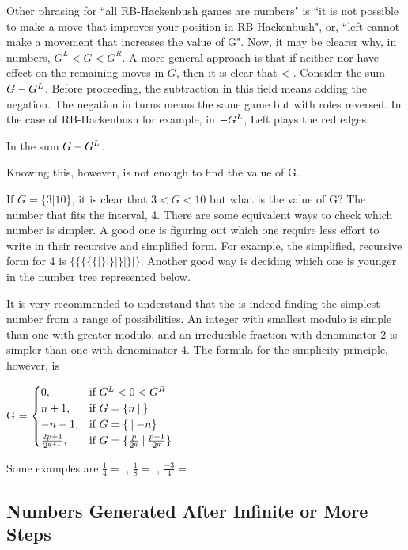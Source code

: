 Other phrasing for ``all RB-Hackenbush games are numbers" is ``it is not possible to make a move that improves your position in  RB-Hackenbush", or, ``left cannot make a movement that increases the value of G". Now, it may be clearer why, in numbers, $G^L < G < G^R$. A more general approach is that if neither  nor  have effect on the remaining moves in $G$, then it is clear that  < \Gm{}. Consider the sum $\mbox{$G$} - \mbox{$G^L$}$. Before proceeding, the subtraction in this field means adding the negation. The negation in turns means the same game but with roles reversed. In the case of RB-Hackenbush for example, in ${-}\mbox{$G^L$}$, Left plays the red edges.

In the sum $\mbox{$G$} - \mbox{$G^L$}$.

Knowing this, however, is not enough to find the value of G.

If $G = \{3 | 10\}$, it is clear that $3 < G < 10$ but what is the value of G? The  number that fits the interval, 4. There are some equivalent ways to check which number is simpler. A good one is figuring out which one require less effort to write in their recursive and simplified form. For example, the simplified, recursive form for 4 is $\{\{\{\{\{|\}|\}|\}|\} | \}$. Another good way is deciding which one is younger in the number tree represented below.

It is very recommended to understand that the  is indeed finding the simplest number from a range of possibilities. An integer with smallest modulo is simple than one with greater modulo, and an irreducible fraction with denominator 2 is simpler than one with denominator 4. The formula for the simplicity principle, however, is 

G = 
$
\begin{cases}
	0, &\text{if } G^L < 0 < G^R\\
	n+1, &\text{if } \mbox{$G= \mbox{$\{n\:|\:\}$}$}\\
	-n-1, &\text{if } \mbox{$G= \mbox{$\{\:|\:{-}n\}$}$}\\
	\frac{2p + 1}{2^{q+1}}, &\text{if } \mbox{$G= \mbox{$\{\frac{p}{2^q}\:|\: \frac{p+1}{2^q}\}$}$}
\end{cases}
$

\vspace{0.6em}Some examples are $\frac{1}{4} =$ , $\frac{1}{8} =$ , $\frac{-3}{4} =$ .

\subsection*{Numbers Generated After Infinite or More Steps}

